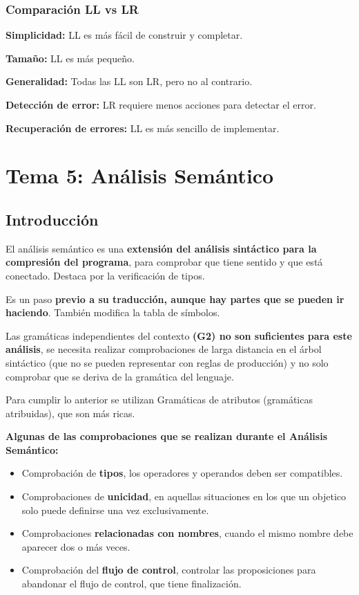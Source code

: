 \documentclass[12pt]{report} %
\begin{document}
\subsection{Comparación LL vs LR}
\textbf{Simplicidad:} LL es más fácil de construir y completar.

\textbf{Tamaño:} LL es más pequeño.

\textbf{Generalidad:} Todas las LL son LR, pero no al contrario.

\textbf{Detección de error:} LR requiere menos acciones para detectar el error.

\textbf{Recuperación de errores:} LL es más sencillo de implementar.

\chapter{Tema 5: Análisis Semántico}

\section{Introducción}
El análisis semántico es una \textbf{extensión del análisis sintáctico para la compresión del programa}, para comprobar que tiene sentido y que está conectado. Destaca por la verificación de tipos.

Es un paso \textbf{previo a su traducción, aunque hay partes que se pueden ir haciendo}. También modifica la tabla de símbolos.

Las gramáticas independientes del contexto \textbf{(G2) no son suficientes para este análisis}, se necesita realizar comprobaciones de larga distancia en el árbol sintáctico (que no se pueden representar con reglas de producción) y no solo comprobar que se deriva de la gramática del lenguaje.

Para cumplir lo anterior se utilizan Gramáticas de atributos (gramáticas atribuidas), que son más ricas.

\textbf{Algunas de las comprobaciones que se realizan durante el Análisis Semántico:}
\begin{itemize}
  \item Comprobación de \textbf{tipos}, los operadores y operandos deben ser compatibles.
  \item Comprobaciones de \textbf{unicidad}, en aquellas situaciones en los que un objetico solo puede definirse una vez exclusivamente.
  \item Comprobaciones \textbf{relacionadas con nombres}, cuando el mismo nombre debe aparecer dos o más veces.
  \item Comprobación del \textbf{flujo de control}, controlar las proposiciones para abandonar el flujo de control, que tiene finalización.
\end{itemize}
\pagebreak
\end{document}
